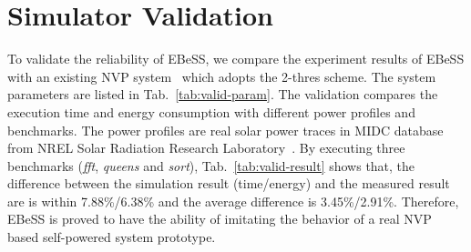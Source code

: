 \section{Simulator Validation}	\label{sec:valid}
%
To validate the reliability of EBeSS, we compare the experiment results of EBeSS with an existing NVP system~\cite{Liu2015Ambient} which adopts the 2-thres scheme. 
The system parameters are listed in Tab.~\ref{tab:valid-param}.
The validation compares the execution time and energy consumption with different power profiles and benchmarks.
The power profiles are real solar power traces in MIDC database from NREL Solar Radiation Research Laboratory~\cite{midc2015solar}.
By executing three benchmarks (\emph{fft}, \emph{queens} and \emph{sort}), Tab.~\ref{tab:valid-result} shows that, the difference between the simulation result (time/energy) and the measured result are is within 7.88\%/6.38\% and the average difference is 3.45\%/2.91\%.
Therefore, EBeSS is proved to have the ability of imitating the behavior of a real NVP based self-powered system prototype.



